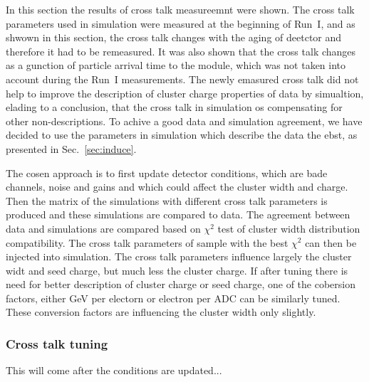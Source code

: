 In this section the results of cross talk measureemnt were shown. The cross talk parameters used in simulation were measured at the beginning of Run~I, and as shwown in this section, the cross talk changes with the aging of deetctor and therefore it had to be remeasured. It was also shown that the cross talk changes as a gunction of particle arrival time to the module, which was not taken into account during the Run~I measurements. The newly emasured cross talk did not help to improve the description of cluster charge properties of data by simualtion, elading to a conclusion, that the cross talk in simulation os compensating for other non-descriptions. To achive a good data and simulation agreement, we have decided to use the parameters in simulation which describe the data the ebst, as presented in Sec.~\ref{sec:induce}. 

The cosen approach is to first update detector conditions, which are bade channels, noise and gains and which could affect the cluster width and charge. Then the matrix of the simulations with different cross talk parameters is produced and these simulations are compared to data. The agreement between data and simulations are compared based on $\chi^{2}$ test of cluster width distribution compatibility. The cross talk parameters of sample with the best $\chi^{2}$ can then be injected into simulation. The cross talk parameters influence largely the cluster widt and seed charge, but much less the cluster charge. If after tuning there is need for better description of cluster charge or seed charge, one of the cobersion factors, either GeV per electorn or electron per ADC can be similarly tuned. These conversion factors are influencing the cluster width only slightly.



\subsubsection{Cross talk tuning}

This will come after the conditions are updated...





